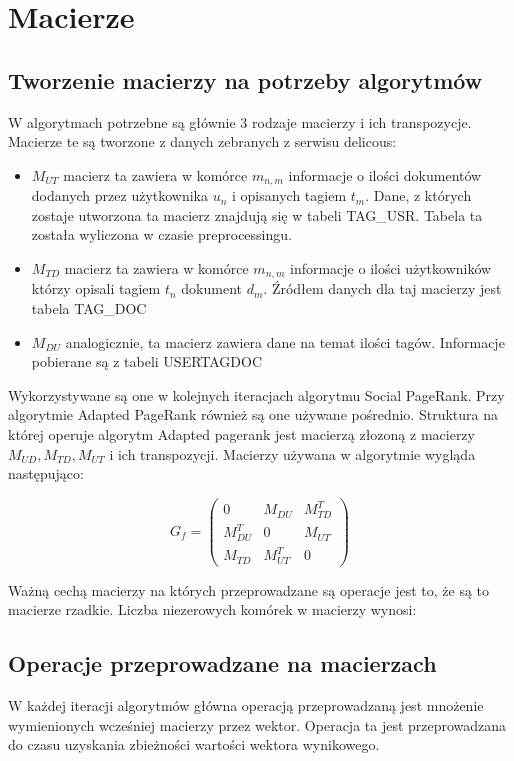 \documentclass[11pt,a4paper]{report}
\begin{document}
\tableofcontents
\chapter{Macierze}
\section{Tworzenie macierzy na potrzeby algorytmów}
W algorytmach potrzebne są głównie 3 rodzaje macierzy i ich transpozycje. Macierze te są tworzone z danych zebranych z serwisu delicous:
\begin{itemize}
	\item $M_{UT}$ macierz ta zawiera w komórce $m_{n,m}$ informacje o ilości dokumentów dodanych przez użytkownika $u_n$ i opisanych tagiem $t_m$. Dane, z których zostaje utworzona ta macierz znajdują się w tabeli TAG\_USR. Tabela ta została wyliczona w czasie preprocessingu.
	\item $M_{TD}$ macierz ta zawiera w komórce $m_{n,m}$ informacje o ilości użytkowników którzy opisali tagiem $t_n$ dokument $d_m$. Źródłem danych dla taj macierzy jest tabela TAG\_DOC
	\item $M_{DU}$ analogicznie, ta macierz zawiera dane na temat ilości tagów. Informacje pobierane są z tabeli USERTAGDOC
\end{itemize}

Wykorzystywane są one w kolejnych iteracjach algorytmu Social PageRank. Przy algorytmie Adapted PageRank również są one używane pośrednio. Struktura na której operuje algorytm Adapted pagerank jest macierzą złozoną z macierzy $M_{UD} , M_{TD}, M_{UT}$ i ich transpozycji. Macierzy używana w algorytmie wygląda następująco:

\[
 G_f =
 \begin{pmatrix}
  0                     & M_{DU}       & M_{TD}^T \\
  M_{DU}^T  & 0                     & M_{UT}     \\
  M_{TD}       & M_{UT}^T   & 0 
 \end{pmatrix}
\]

Ważną cechą macierzy na których przeprowadzane są operacje jest to, że są to macierze rzadkie. Liczba niezerowych komórek w macierzy wynosi: 

\section{Operacje przeprowadzane na macierzach}
W każdej iteracji algorytmów główna operacją przeprowadzaną jest mnożenie wymienionych wcześniej macierzy przez wektor. Operacja ta jest przeprowadzana do czasu uzyskania zbieżności wartości wektora wynikowego.
\end{document}
